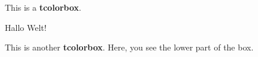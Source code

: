 \documentclass[12pt,ngerman]{scrartcl}
\begin{document}
\begin{tcolorbox}
This is a \textbf{tcolorbox}.
\end{tcolorbox}

\begin{tcolorbox}[arc=0pt,colback=red!10!white,colframe=blue!75,title={Hinweise!}]
Hallo Welt!
\end{tcolorbox}


\begin{tcolorbox}[colback=red!5!white,colframe=red!75!black,title=My nice heading]
This is another \textbf{tcolorbox}.
\tcblower
Here, you see the lower part of the box.
\end{tcolorbox}
\end{document}
